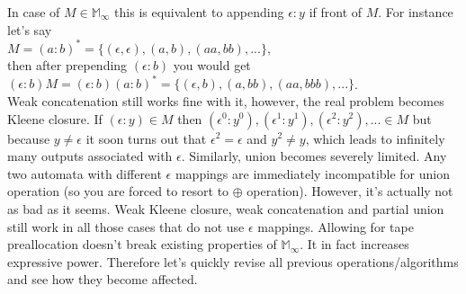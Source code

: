 \documentclass[12pt]{article}
\begin{document}
In case of $M \in \mathbb{ M}_\infty$ this is equivalent to appending $\epsilon : y$ if front of $M$. For instance let's say \\
$M = (a:b)^* = \{ (\epsilon,\epsilon), (a,b), (aa,bb),... \}$, \\
then after prepending $(\epsilon : b)$ you would get \\
$(\epsilon : b)M =  (\epsilon : b)(a:b)^* = \{(\epsilon,b), (a,bb), (aa,bbb),...  \}$. \\
Weak concatenation still works fine with it, however, the real problem becomes Kleene closure. If $(\epsilon:y) \in M$ then $(\epsilon^0:y^0) ,(\epsilon^1:y^1), (\epsilon^2:y^2) , ... \in M$ but because $y\ne \epsilon$ it soon turns out that $\epsilon^2 = \epsilon$ and $y^2 \ne y$, which leads to infinitely many outputs associated with $\epsilon$. Similarly, union becomes severely limited. Any two automata with different $\epsilon$ mappings are immediately incompatible for union operation (so you are forced to resort to $\oplus$ operation). However, it's actually not as bad as it seems. Weak Kleene closure, weak concatenation and partial union still work in all those cases that do not use $\epsilon$ mappings. Allowing for tape preallocation doesn't break existing properties of $\mathbb{ M}_\infty$. It in fact increases expressive power.  Therefore let's quickly revise all previous operations/algorithms and see how they become affected. 
\end{document}
